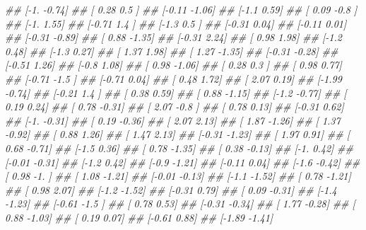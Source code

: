 \documentclass[
]{book}
\newenvironment{Shaded}{\begin{snugshade}}{\end{snugshade}}
\newcommand{\CommentTok}[1]{\textcolor[rgb]{0.56,0.35,0.01}{\textit{#1}}}
\theoremstyle{definition}
\theoremstyle{definition}
\theoremstyle{definition}
\theoremstyle{definition}
\theoremstyle{remark}
\begin{document}
\begin{Shaded}
\begin{Highlighting}[]
\CommentTok{\#\#  [{-}1.   {-}0.74]}
\CommentTok{\#\#  [ 0.28  0.5 ]}
\CommentTok{\#\#  [{-}0.11 {-}1.06]}
\CommentTok{\#\#  [{-}1.1   0.59]}
\CommentTok{\#\#  [ 0.09 {-}0.8 ]}
\CommentTok{\#\#  [{-}1.    1.55]}
\CommentTok{\#\#  [{-}0.71  1.4 ]}
\CommentTok{\#\#  [{-}1.3   0.5 ]}
\CommentTok{\#\#  [{-}0.31  0.04]}
\CommentTok{\#\#  [{-}0.11  0.01]}
\CommentTok{\#\#  [{-}0.31 {-}0.89]}
\CommentTok{\#\#  [ 0.88 {-}1.35]}
\CommentTok{\#\#  [{-}0.31  2.24]}
\CommentTok{\#\#  [ 0.98  1.98]}
\CommentTok{\#\#  [{-}1.2   0.48]}
\CommentTok{\#\#  [{-}1.3   0.27]}
\CommentTok{\#\#  [ 1.37  1.98]}
\CommentTok{\#\#  [ 1.27 {-}1.35]}
\CommentTok{\#\#  [{-}0.31 {-}0.28]}
\CommentTok{\#\#  [{-}0.51  1.26]}
\CommentTok{\#\#  [{-}0.8   1.08]}
\CommentTok{\#\#  [ 0.98 {-}1.06]}
\CommentTok{\#\#  [ 0.28  0.3 ]}
\CommentTok{\#\#  [ 0.98  0.77]}
\CommentTok{\#\#  [{-}0.71 {-}1.5 ]}
\CommentTok{\#\#  [{-}0.71  0.04]}
\CommentTok{\#\#  [ 0.48  1.72]}
\CommentTok{\#\#  [ 2.07  0.19]}
\CommentTok{\#\#  [{-}1.99 {-}0.74]}
\CommentTok{\#\#  [{-}0.21  1.4 ]}
\CommentTok{\#\#  [ 0.38  0.59]}
\CommentTok{\#\#  [ 0.88 {-}1.15]}
\CommentTok{\#\#  [{-}1.2  {-}0.77]}
\CommentTok{\#\#  [ 0.19  0.24]}
\CommentTok{\#\#  [ 0.78 {-}0.31]}
\CommentTok{\#\#  [ 2.07 {-}0.8 ]}
\CommentTok{\#\#  [ 0.78  0.13]}
\CommentTok{\#\#  [{-}0.31  0.62]}
\CommentTok{\#\#  [{-}1.   {-}0.31]}
\CommentTok{\#\#  [ 0.19 {-}0.36]}
\CommentTok{\#\#  [ 2.07  2.13]}
\CommentTok{\#\#  [ 1.87 {-}1.26]}
\CommentTok{\#\#  [ 1.37 {-}0.92]}
\CommentTok{\#\#  [ 0.88  1.26]}
\CommentTok{\#\#  [ 1.47  2.13]}
\CommentTok{\#\#  [{-}0.31 {-}1.23]}
\CommentTok{\#\#  [ 1.97  0.91]}
\CommentTok{\#\#  [ 0.68 {-}0.71]}
\CommentTok{\#\#  [{-}1.5   0.36]}
\CommentTok{\#\#  [ 0.78 {-}1.35]}
\CommentTok{\#\#  [ 0.38 {-}0.13]}
\CommentTok{\#\#  [{-}1.    0.42]}
\CommentTok{\#\#  [{-}0.01 {-}0.31]}
\CommentTok{\#\#  [{-}1.2   0.42]}
\CommentTok{\#\#  [{-}0.9  {-}1.21]}
\CommentTok{\#\#  [{-}0.11  0.04]}
\CommentTok{\#\#  [{-}1.6  {-}0.42]}
\CommentTok{\#\#  [ 0.98 {-}1.  ]}
\CommentTok{\#\#  [ 1.08 {-}1.21]}
\CommentTok{\#\#  [{-}0.01 {-}0.13]}
\CommentTok{\#\#  [{-}1.1  {-}1.52]}
\CommentTok{\#\#  [ 0.78 {-}1.21]}
\CommentTok{\#\#  [ 0.98  2.07]}
\CommentTok{\#\#  [{-}1.2  {-}1.52]}
\CommentTok{\#\#  [{-}0.31  0.79]}
\CommentTok{\#\#  [ 0.09 {-}0.31]}
\CommentTok{\#\#  [{-}1.4  {-}1.23]}
\CommentTok{\#\#  [{-}0.61 {-}1.5 ]}
\CommentTok{\#\#  [ 0.78  0.53]}
\CommentTok{\#\#  [{-}0.31 {-}0.34]}
\CommentTok{\#\#  [ 1.77 {-}0.28]}
\CommentTok{\#\#  [ 0.88 {-}1.03]}
\CommentTok{\#\#  [ 0.19  0.07]}
\CommentTok{\#\#  [{-}0.61  0.88]}
\CommentTok{\#\#  [{-}1.89 {-}1.41]}

\end{Highlighting}
\end{Shaded}
\end{document}
